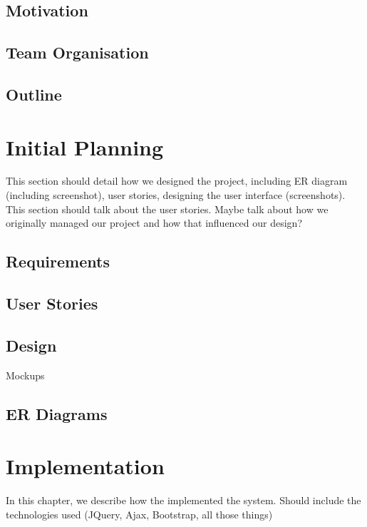 \documentclass[a4paper]{l3proj}
\begin{document}
\section{Motivation}
\section{Team Organisation}
\section{Outline}


\chapter{Initial Planning}
\label{initial planning}

This section should detail how we designed the project, including ER diagram (including screenshot),
user stories, designing the user interface (screenshots). This section should talk about the user stories.
Maybe talk about how we originally managed our project and how that influenced our design?

\section{Requirements}

\section{User Stories}

\section{Design}

Mockups

\section{ER Diagrams}


\chapter{Implementation}
\label{impl}

In this chapter, we describe how the implemented the system.  Should include the technologies used 
(JQuery, Ajax, Bootstrap, all those things)
\end{document}
